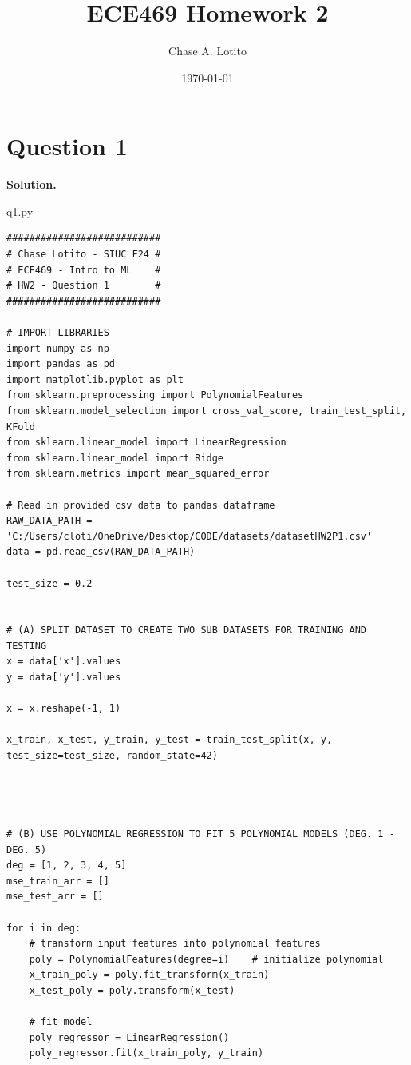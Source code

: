 \documentclass[11pt]{article}
\title{\textbf{ECE469 Homework 2}}
\author{Chase A. Lotito}
\date{\today}
\begin{document}

\maketitle


\section*{Question 1}

\textbf{Solution.}

\begin{center}
  q1.py
\end{center}
\begin{lstlisting}
###########################
# Chase Lotito - SIUC F24 #
# ECE469 - Intro to ML    #
# HW2 - Question 1        #
###########################

# IMPORT LIBRARIES
import numpy as np
import pandas as pd
import matplotlib.pyplot as plt
from sklearn.preprocessing import PolynomialFeatures
from sklearn.model_selection import cross_val_score, train_test_split, KFold
from sklearn.linear_model import LinearRegression
from sklearn.linear_model import Ridge
from sklearn.metrics import mean_squared_error

# Read in provided csv data to pandas dataframe
RAW_DATA_PATH = 'C:/Users/cloti/OneDrive/Desktop/CODE/datasets/datasetHW2P1.csv'
data = pd.read_csv(RAW_DATA_PATH)

test_size = 0.2


# (A) SPLIT DATASET TO CREATE TWO SUB DATASETS FOR TRAINING AND TESTING
x = data['x'].values
y = data['y'].values

x = x.reshape(-1, 1)

x_train, x_test, y_train, y_test = train_test_split(x, y, test_size=test_size, random_state=42)




# (B) USE POLYNOMIAL REGRESSION TO FIT 5 POLYNOMIAL MODELS (DEG. 1 - DEG. 5)
deg = [1, 2, 3, 4, 5]
mse_train_arr = []
mse_test_arr = []

for i in deg:
    # transform input features into polynomial features
    poly = PolynomialFeatures(degree=i)    # initialize polynomial
    x_train_poly = poly.fit_transform(x_train)
    x_test_poly = poly.transform(x_test)

    # fit model
    poly_regressor = LinearRegression()
    poly_regressor.fit(x_train_poly, y_train)


\end{lstlisting}
\end{document}
